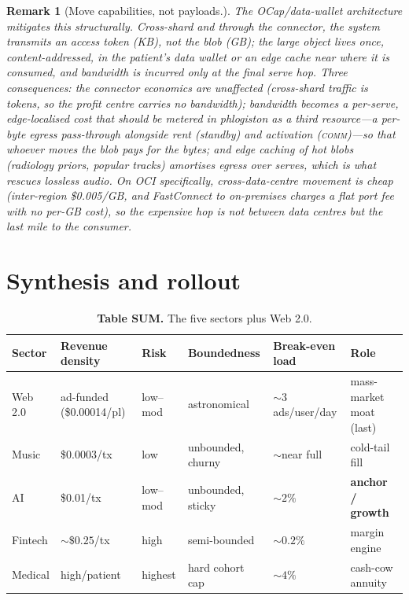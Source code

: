 \documentclass[11pt]{article}
\newtheorem{remark}{Remark}
\begin{document}
\begin{remark}[Move capabilities, not payloads.]
The OCap/data-wallet architecture mitigates this structurally. Cross-shard and through the connector, the system transmits an access token (KB), not the blob (GB); the large object lives once, content-addressed, in the patient's data wallet or an edge cache near where it is consumed, and bandwidth is incurred only at the final serve hop. Three consequences: the connector economics are unaffected (cross-shard traffic is tokens, so the profit centre carries no bandwidth); bandwidth becomes a per-serve, edge-localised cost that should be metered in phlogiston as a third resource---a per-byte egress pass-through alongside rent (standby) and activation (\textsc{comm})---so that whoever moves the blob pays for the bytes; and edge caching of hot blobs (radiology priors, popular tracks) amortises egress over serves, which is what rescues lossless audio. On OCI specifically, cross-data-centre movement is cheap (inter-region \$0.005/GB, and FastConnect to on-premises charges a flat port fee with no per-GB cost), so the expensive hop is not between data centres but the last mile to the consumer.
\end{remark}

\section{Synthesis and rollout}
\label{sec:synthesis}

\begin{table}[h]
\centering
\caption*{\textbf{Table SUM.} The five sectors plus Web 2.0.}
\setlength{\tabcolsep}{5pt}
\renewcommand{\arraystretch}{1.2}
\begin{tabular}{@{}llllll@{}}
\toprule
\rowcolor{headrow}
Sector & Revenue density & Risk & Boundedness & Break-even load & Role \\
\midrule
Web 2.0  & ad-funded (\$0.00014/pl) & low--mod & astronomical & ${\sim}3$ ads/user/day & mass-market moat (last) \\
Music    & \$0.0003/tx              & low      & unbounded, churny & ${\sim}$near full & cold-tail fill \\
AI       & \$0.01/tx                & low--mod & unbounded, sticky & ${\sim}2\%$ & \textbf{anchor / growth} \\
Fintech  & ${\sim}\$0.25$/tx        & high     & semi-bounded & ${\sim}0.2\%$ & margin engine \\
Medical  & high/patient             & highest  & hard cohort cap & ${\sim}4\%$ & cash-cow annuity \\
\bottomrule
\end{tabular}
\end{table}
\end{document}
